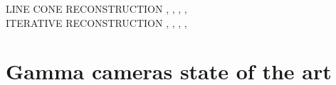 LINE CONE RECONSTRUCTION \parencite{Cree1994}, \parencite{Basko1998}, \parencite{Parra1999}, \parencite{Hirasawa2003}, \parencite{Maxim2009} \\

ITERATIVE RECONSTRUCTION \parencite{Schone2010}, \parencite{Zoglauer2011}, \parencite{Gillam2011}, \parencite{Lojacono2013}, \parencite{Mackin2012}\\

\section{Gamma cameras state of the art}

\clearpage
